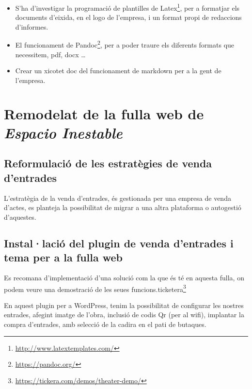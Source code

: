 \documentclass[
  10pt,
]{krantz}
\DeclareRobustCommand{\href}[2]{#2\footnote{\url{#1}}}
\providecommand{\tightlist}{%
  \setlength{\itemsep}{0pt}\setlength{\parskip}{0pt}}
\begin{document}
\begin{itemize}
\tightlist
\item
  S'ha d'investigar la programació de plantilles de \href{http://www.latextemplates.com/}{Latex}, per a formatjar els documents d'eixida, en el logo de l'empresa, i un format propi de redaccions d'informes.
\item
  El funcionament de \href{https://pandoc.org/}{Pandoc}, per a poder traure els diferents formats que necessitem, pdf, docx \ldots{}
\item
  Crear un xicotet doc del funcionament de markdown per a la gent de l'empresa.
\end{itemize}

\hypertarget{remodelat-de-la-fulla-web-de-espacio-inestable}{%
\chapter{\texorpdfstring{Remodelat de la fulla web de \emph{Espacio Inestable}}{Remodelat de la fulla web de Espacio Inestable}}\label{remodelat-de-la-fulla-web-de-espacio-inestable}}

\hypertarget{reformulaciuxf3-de-les-estratuxe8gies-de-venda-dentrades}{%
\section{Reformulació de les estratègies de venda d'entrades}\label{reformulaciuxf3-de-les-estratuxe8gies-de-venda-dentrades}}

L'estratègia de la venda d'entrades, és gestionada per una empresa de venda d'actes, es planteja la possibilitat de migrar a una altra plataforma o autogestió d'aquestes.

\hypertarget{installaciuxf3-del-plugin-de-venda-dentrades-i-tema-per-a-la-fulla-web}{%
\section{Instal·lació del plugin de venda d'entrades i tema per a la fulla web}\label{installaciuxf3-del-plugin-de-venda-dentrades-i-tema-per-a-la-fulla-web}}

Es recomana d'implementació d'una solució com la que és té en aquesta fulla, on podem veure una demostració de les seues funcions.\href{https://tickera.com/demos/theater-demo/}{ticketera}

En aquest plugin per a WordPress, tenim la possibilitat de configurar les nostres entrades, afegint imatge de l'obra, inclusió de codis Qr (per al wifi), implantar la compra d'entrades, amb selecció de la cadira en el pati de butaques.
\end{document}
